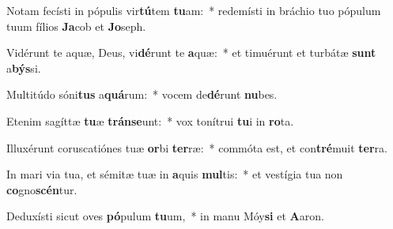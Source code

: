 \item Notam fecísti in pópulis vir\textbf{tú}tem \textbf{tu}am:~* redemísti in bráchio tuo pópulum tuum fílios \textbf{Ja}cob et \textbf{Jo}seph.
\item Vidérunt te aquæ, Deus, vi\textbf{dé}runt te \textbf{a}quæ:~* et timuérunt et turbátæ \textbf{sunt} a\textbf{býs}si.
\item Multitúdo sóni\textbf{tus} a\textbf{quá}rum:~* vocem de\textbf{dé}runt \textbf{nu}bes.
\item Etenim sagíttæ \textbf{tu}æ \textbf{tráns}\textbf{e}unt:~* vox tonítrui \textbf{tu}i in \textbf{ro}ta.
\item Illuxérunt coruscatiónes tuæ \textbf{or}bi \textbf{ter}ræ:~* commóta est, et con\textbf{tré}muit \textbf{ter}ra.
\item In mari via tua, et sémitæ tuæ in \textbf{a}quis \textbf{mul}tis:~* et vestígia tua non \textbf{co}gno\textbf{scén}tur.
\item Deduxísti sicut oves \textbf{pó}pulum \textbf{tu}um,~* in manu Móy\textbf{si} et \textbf{A}aron.

